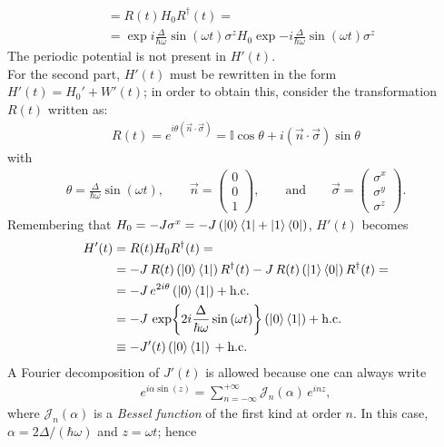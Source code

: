 \begin{tcolorbox}
\begin{align*}
    &= R(t) H_0 R^\dagger(t) = \\
    &= \exp{i \frac{\Delta}{\hbar \omega} \sin{(\omega t)} \sigma^z} H_0 \exp{-i \frac{\Delta}{\hbar \omega} \sin{(\omega t)} \sigma^z}
\end{align*}
The periodic potential is not present in $H'(t)$. \\
For the second part, $H'(t)$ must be rewritten in the form $H'(t) = H_0' + W'(t)$; in order to obtain this, consider the transformation $R(t)$ written as:
\begin{align*}
    R(t) = e^{i \theta (\Vec{n} \cdot \Vec{\sigma})} = \mathbb{I} \cos{\theta} + i (\Vec{n} \cdot \Vec{\sigma}) \sin{\theta} 
\end{align*}
with 
\begin{align*}
    \theta = \frac{\Delta}{\hbar \omega} \sin{(\omega t)}, \qquad \Vec{n} = \begin{pmatrix} 0 \\ 0 \\ 1 \end{pmatrix}, \qquad \text{and} \qquad \Vec{\sigma} = \begin{pmatrix} \sigma^x \\ \sigma^y \\ \sigma^z \end{pmatrix}.
\end{align*}
Remembering that $H_0 = -J \sigma^x = -J \, (\ket{0}\bra{1} + \ket{1}\bra{0})$, $H'(t)$ becomes 
\begin{align*}
    H'(t) &= R(t) H_0 R^\dagger(t) = \\
    &=- J \,  R(t)\, (\ket{0}\bra{1}) \, R^\dagger(t) - J \,  R(t)\, (\ket{1}\bra{0}) \, R^\dagger(t) = \\
    &= -J \, e^{2 i \theta}\, (\ket{0}\bra{1}) + \text{h.c.} \\
    &= -J \, \exp{2 i \frac{\Delta}{\hbar \omega} \sin{(\omega t)}}\, (\ket{0}\bra{1}) + \text{h.c.} \\
    &\equiv -J'(t)\, (\ket{0}\bra{1}) \, + \text{h.c.} 
\end{align*}
A Fourier decomposition of $J'(t)$ is allowed because one can always write 
\begin{align*}
    e^{i \alpha \sin(z)} = \sum_{n = -\infty}^{+\infty} \mathcal{J}_n(\alpha) \, e^{i n z},
\end{align*}
where $\mathcal{J}_n(\alpha)$ is a \textit{Bessel function} of the first kind at order $n$. In this case, $\alpha = 2 \Delta / (\hbar \omega)$ and $z = \omega t$; hence
\begin{align*}

\end{align*}
\end{tcolorbox}
